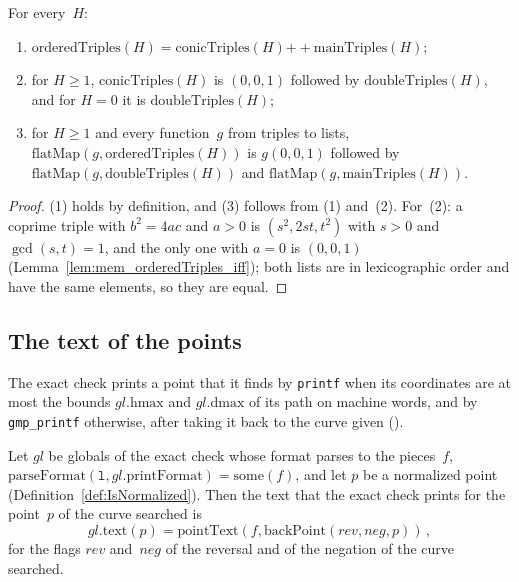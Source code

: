 \begin{lemma}\label{lem:flatMap_orderedTriples}
  \leanok
  For every~$H$:
  \begin{enumerate}
    \item $\mathrm{orderedTriples}(H) = \mathrm{conicTriples}(H) \mathbin{+\!\!+}
      \mathrm{mainTriples}(H)$;
    \item for $H \ge 1$, $\mathrm{conicTriples}(H)$ is $(0, 0, 1)$ followed by
      $\mathrm{doubleTriples}(H)$, and for $H = 0$ it is $\mathrm{doubleTriples}(H)$;
    \item for $H \ge 1$ and every function~$g$ from triples to lists,
      $\mathrm{flatMap}(g, \mathrm{orderedTriples}(H))$ is $g(0, 0, 1)$ followed by
      $\mathrm{flatMap}(g, \mathrm{doubleTriples}(H))$ and $\mathrm{flatMap}(g,
      \mathrm{mainTriples}(H))$.
  \end{enumerate}
\end{lemma}

\begin{proof}
  \leanok
  (1) holds by definition, and (3) follows from (1) and~(2). For~(2): a coprime triple with
  $b^2 = 4ac$ and $a > 0$ is $(s^2, 2st, t^2)$ with $s > 0$ and $\gcd(s, t) = 1$, and the only one
  with $a = 0$ is $(0, 0, 1)$ (Lemma~\ref{lem:mem_orderedTriples_iff}); both lists are in
  lexicographic order and have the same elements, so they are equal.
\end{proof}

\subsection{The text of the points}\label{sec:theoremsText}

The exact check prints a point that it finds by \texttt{printf} when its coordinates are at most
the bounds $\mathit{gl}.\mathrm{hmax}$ and $\mathit{gl}.\mathrm{dmax}$ of its path on machine words,
and by \texttt{gmp\_printf} otherwise, after taking it back to the curve given
().

\begin{lemma}\label{lem:CheckGlobals.text_eq_pointText}
  \leanok
  Let $\mathit{gl}$ be globals of the exact check whose format parses to the pieces~$f$,
  $\mathrm{parseFormat}(\texttt{l}, \mathit{gl}.\mathrm{printFormat}) = \mathrm{some}(f)$, and let
  $p$ be a normalized point (Definition~\ref{def:IsNormalized}). Then the text that the exact check
  prints for the point~$p$ of the curve searched is
  \[ \mathit{gl}.\mathrm{text}(p)
       = \mathrm{pointText}(f, \mathrm{backPoint}(\mathit{rev}, \mathit{neg}, p))\,, \]
  for the flags $\mathit{rev}$ and~$\mathit{neg}$ of the reversal and of the negation of the curve
  searched.
\end{lemma}

